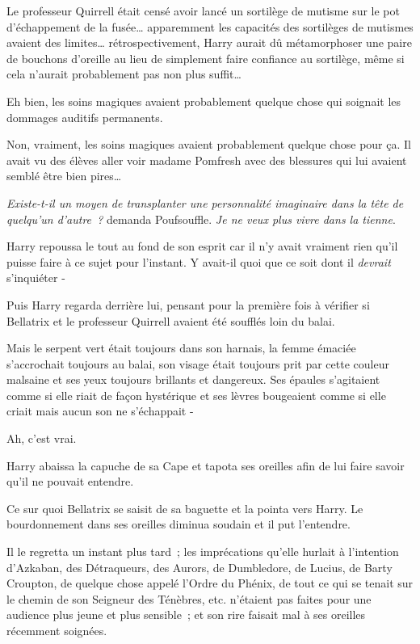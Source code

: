 Le professeur Quirrell était censé avoir lancé un sortilège de mutisme sur le pot d'échappement de la fusée… apparemment les capacités des sortilèges de mutismes avaient des limites… rétrospectivement, Harry aurait dû métamorphoser une paire de bouchons d'oreille au lieu de simplement faire confiance au sortilège, même si cela n'aurait probablement pas non plus suffit…

Eh bien, les soins magiques avaient probablement quelque chose qui soignait les dommages auditifs permanents.

Non, vraiment, les soins magiques avaient probablement quelque chose pour ça. Il avait vu des élèves aller voir madame Pomfresh avec des blessures qui lui avaient semblé être bien pires…

\emph{Existe-t-il un moyen de transplanter une personnalité imaginaire dans la tête de quelqu'un d'autre~?} demanda Poufsouffle. \emph{Je ne veux plus vivre dans la tienne}.

Harry repoussa le tout au fond de son esprit car il n'y avait vraiment rien qu'il puisse faire à ce sujet pour l'instant. Y avait-il quoi que ce soit dont il \emph{devrait} s'inquiéter -

Puis Harry regarda derrière lui, pensant pour la première fois à vérifier si Bellatrix et le professeur Quirrell avaient été soufflés loin du balai.

Mais le serpent vert était toujours dans son harnais, la femme émaciée s'accrochait toujours au balai, son visage était toujours prit par cette couleur malsaine et ses yeux toujours brillants et dangereux. Ses épaules s'agitaient comme si elle riait de façon hystérique et ses lèvres bougeaient comme si elle criait mais aucun son ne s'échappait -

Ah, c'est vrai.

Harry abaissa la capuche de sa Cape et tapota ses oreilles afin de lui faire savoir qu'il ne pouvait entendre.

Ce sur quoi Bellatrix se saisit de sa baguette et la pointa vers Harry. Le bourdonnement dans ses oreilles diminua soudain et il put l'entendre.

Il le regretta un instant plus tard~; les imprécations qu'elle hurlait à l'intention d'Azkaban, des Détraqueurs, des Aurors, de Dumbledore, de Lucius, de Barty Croupton, de quelque chose appelé l'Ordre du Phénix, de tout ce qui se tenait sur le chemin de son Seigneur des Ténèbres, etc. n'étaient pas faites pour une audience plus jeune et plus sensible~; et son rire faisait mal à ses oreilles récemment soignées.

